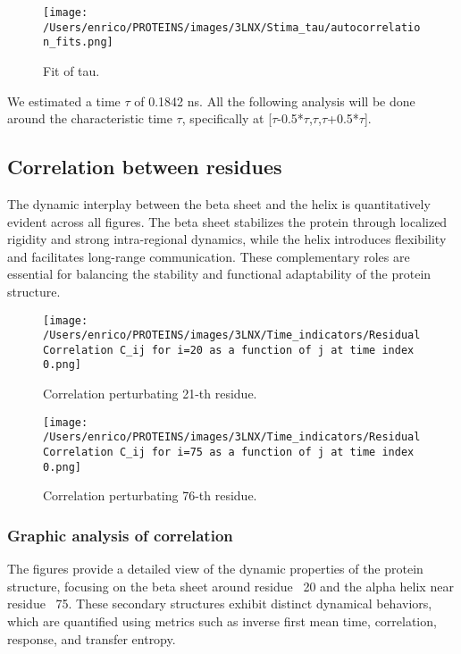 \documentclass[English, Lau, oneside]{sapthesis}
\begin{document}
\begin{figure}[h!]
    \centering
    \texttt{[image: /Users/enrico/PROTEINS/images/3LNX/Stima\_tau/autocorrelation\_fits.png]}
    \caption{Fit of tau.}
\end{figure}
We estimated a time \(\tau\) of 0.1842 ns.
All the following analysis will be done around the characteristic time \(\tau\), specifically at [\(\tau\)-0.5*\(\tau\),\(\tau\),\(\tau\)+0.5*\(\tau\)].

\newpage



\subsection{Correlation between residues}
\noindent The dynamic interplay between the beta sheet and the helix is quantitatively evident across all figures. The beta sheet stabilizes the protein through localized rigidity and strong intra-regional dynamics, while the helix introduces flexibility and facilitates long-range communication. These complementary roles are essential for balancing the stability and functional adaptability of the protein structure.

\begin{figure}[h!]
    \centering
    \texttt{[image: /Users/enrico/PROTEINS/images/3LNX/Time\_indicators/Residual Correlation C\_ij for i=20 as a function of j at time index 0.png]}
    \caption{Correlation perturbating 21-th residue.}
    \label{fig:corr21}
\end{figure}

\begin{figure}[h!]
    \centering
    \texttt{[image: /Users/enrico/PROTEINS/images/3LNX/Time\_indicators/Residual Correlation C\_ij for i=75 as a function of j at time index 0.png]}
    \caption{Correlation perturbating 76-th residue.}
    \label{fig:corr76}
\end{figure}
\subsubsection{Graphic analysis of correlation}
The figures provide a detailed view of the dynamic properties of the protein structure, focusing on the beta sheet around residue ~20 and the alpha helix near residue ~75. These secondary structures exhibit distinct dynamical behaviors, which are quantified using metrics such as inverse first mean time, correlation, response, and transfer entropy.
\end{document}
